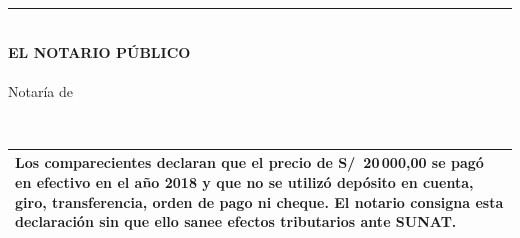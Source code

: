 \documentclass[12pt,a4paper]{article}
\begin{document}
\vspace{0.45em}
\noindent
\hfill
\begin{minipage}[t]{0.48\textwidth}
\centering
\vspace{1.2cm}
{\color{tinta}\rule{0.92\textwidth}{0.45pt}}\\[0.25em]
\textbf{\small EL NOTARIO PÚBLICO}\\[0.12em]
{\small \NotarioNombre}\\
{\small Notaría de \NotariaCiudad}\\[0.35em]
\end{minipage}

\vspace{0.8em}
\\
{\small\renewcommand{\arraystretch}{1.2}
\begin{tabularx}{\textwidth}{|X|}
\hline
Los comparecientes declaran que el precio de S/\ 20\,000,00 se pagó en efectivo en el año 2018 y que \textbf{no se utilizó} depósito en cuenta, giro, transferencia, orden de pago ni cheque. El notario consigna esta declaración sin que ello sanee efectos tributarios ante SUNAT. \\
\hline
\end{tabularx}}
\end{document}
